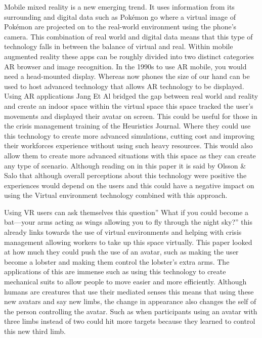 \documentclass[11pt]{scrartcl}
\begin{document}
Mobile mixed reality is a new emerging trend. It uses information from its surrounding and digital data such as Pokémon go where a virtual image of Pokémon are projected on to the real-world environment using the phone's camera. This combination of real world and digital data means that this type of technology falls in between the balance of virtual and real. 
Within mobile augmented reality these apps can be roughly divided into two distinct categories AR browser and image recognition. In the 1990s to use AR mobile, you would need a head-mounted display. Whereas now phones the size of our hand can be used to host advanced technology that allows AR technology to be displayed. Using AR applications Jang Et Al\cite{jang2011overlapping}  bridged the gap between real world and reality and create an indoor space within the virtual space this space tracked the user’s movements and displayed their avatar on screen. This could be useful for those in the crisis management training of the Heuristics Journal. Where they could use this technology to create more advanced simulations, cutting cost and improving their workforces experience without using such heavy resources. This would also allow them to create more advanced situations with this space as they can create any type of scenario. Although reading on in this paper it is said by Olsson \& Salo\cite{olsson2011online} that although overall perceptions about this technology were positive the experiences would depend on the users and this could have a negative impact on using the Virtual environment technology combined with this approach.\cite{venta2014investigating}

Using VR users can ask themselves this question” What if you could become a bat—your arms acting as wings allowing you to fly through the night sky?” this already links towards the use of virtual environments and helping with crisis management allowing workers to take up this space virtually. This paper looked at how much they could push the use of an avatar, such as making the user become a lobster and making them control the lobster’s extra arms. The applications of this are immense such as using this technology to create mechanical suits to allow people to move easier and more efficiently. Although humans are creatures that use their mediated senses this means that using these new avatars and say new limbs, the change in appearance also changes the self of the person controlling the avatar. Such as when participants using an avatar with three limbs instead of two could hit more targets because they learned to control this new third limb.\cite{won2015homuncular}
\end{document}
